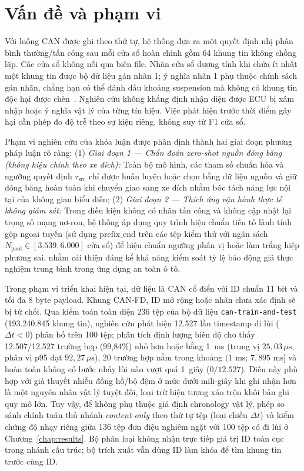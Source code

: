 \documentclass[12pt, a4paper, reqno, oneside]{book}
\newcommand\sect[1]{%
  \Needspace{5\baselineskip}%
  \phantomsection%
  \addcontentsline{toc}{section}{#1}%
  \section*{#1}%
}
\begin{document}
\sect{Vấn đề và phạm vi}
Với luồng CAN được ghi theo thứ tự, hệ thống đưa ra một quyết định nhị phân bình thường/tấn công sau mỗi cửa sổ hoàn chỉnh gồm 64 khung tin không chồng lặp. Các cửa sổ không nối qua biên file. Nhãn cửa sổ dương tính khi chứa ít nhất một khung tin được bộ dữ liệu gán nhãn 1; ý nghĩa nhãn 1 phụ thuộc chính sách gán nhãn, chẳng hạn có thể đánh dấu khoảng suspension mà không có khung tin độc hại được chèn~\cite{rajapaksha2024canmirgu}. Nghiên cứu không khẳng định nhận diện được ECU bị xâm nhập hoặc ý nghĩa vật lý của từng tín hiệu. Việc phát hiện trước thời điểm gây hại cần phép đo độ trễ theo sự kiện riêng, không suy từ F1 cửa sổ.

Phạm vi nghiên cứu của khóa luận được phân định thành hai giai đoạn phương pháp luận rõ ràng:
(1) \textit{Giai đoạn 1 --- Chẩn đoán zero-shot nguồn đóng băng (không hiệu chỉnh theo xe đích):} Toàn bộ mô hình, các tham số chuẩn hóa và ngưỡng quyết định $\tau_{\text{src}}$ chỉ được huấn luyện hoặc chọn bằng dữ liệu nguồn và giữ đóng băng hoàn toàn khi chuyển giao sang xe đích nhằm bóc tách năng lực nội tại của không gian biểu diễn;
(2) \textit{Giai đoạn 2 --- Thích ứng vận hành thực tế không giám sát:} Trong điều kiện không có nhãn tấn công và không cập nhật lại trọng số mạng nơ-ron, hệ thống áp dụng quy trình hiệu chuẩn tiền tố lành tính gộp ngoại tuyến (sử dụng $\mathrm{prefix\_end}$ trên các tệp kiểm thử với ngân sách $N_{\text{pool}} \in [3.539, 6.000]$ cửa sổ) để hiệu chuẩn ngưỡng phân vị hoặc làm trắng hiệp phương sai, nhằm cải thiện đáng kể khả năng kiểm soát tỷ lệ báo động giả thực nghiệm trung bình trong ứng dụng an toàn ô tô.

Trong phạm vi triển khai hiện tại, dữ liệu là CAN cổ điển với ID chuẩn 11 bit và tối đa 8 byte payload. Khung CAN-FD, ID mở rộng hoặc nhãn chưa xác định sẽ bị từ chối. Qua kiểm toán toàn diện 236 tệp của bộ dữ liệu \texttt{can-train-and-test} (193.240.845 khung tin), nghiên cứu phát hiện 12.527 lần timestamp đi lùi ($\Delta t < 0$) phân bố trên 100 tệp; phân tích định lượng biên độ cho thấy 12.507/12.527 trường hợp (99,84\%) nhỏ hơn hoặc bằng 1~ms (trung vị $25{,}03\,\mu\text{s}$, phân vị p95 đạt $92{,}27\,\mu\text{s}$), 20 trường hợp nằm trong khoảng $(1\text{ ms};\, 7{,}895\text{ ms}]$ và hoàn toàn không có bước nhảy lùi nào vượt quá 1~giây ($0/12.527$). Điều này phù hợp với giả thuyết nhiễu đồng hồ/bộ đệm ở mức dưới mili-giây khi ghi nhận hơn là một nguyên nhân vật lý tuyệt đối, loại trừ hiện tượng xáo trộn khối bản ghi quy mô lớn. Tuy vậy, để không phụ thuộc giả định chronology vật lý, phép so sánh chính tuân thủ nhánh \textit{content-only} theo thứ tự tệp (loại chiều $\Delta t$) và kiểm chứng độ nhạy riêng giữa 136 tệp đơn điệu nghiêm ngặt với 100 tệp có đi lùi ở Chương~\ref{chap:results}. Bộ phân loại không nhận trực tiếp giá trị ID toàn cục trong nhánh cấu trúc; bộ trích xuất vẫn dùng ID làm khóa để tìm khung tin trước cùng ID. 
\end{document}
